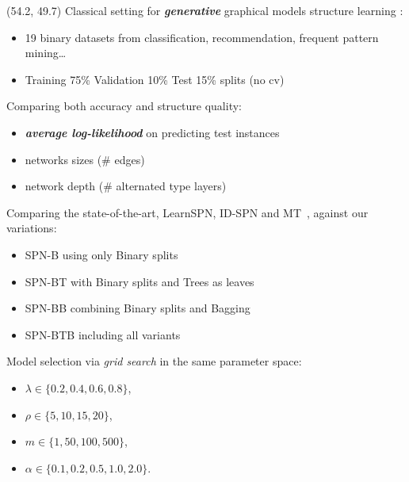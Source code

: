 \documentclass[final]{beamer}
\begin{document}
\begin{frame}{}
  \begin{textblock}{25.7}(54.2, 49.7)
    \footnotesize
    Classical setting for \emph{\textbf{generative}} graphical models
    structure learning \parencite{Gens2013}:
    \setlength{\leftmargini}{30pt}
    \begin{itemize}
      \itemsep 7pt
    \item 19 binary datasets from classification, recommendation,
      frequent pattern mining\dots \parencite{Lowd2010} \parencite{Haaren2012}
    \item Training 75\% Validation 10\% Test 15\%  splits (no cv)
    \end{itemize}\bigskip

    Comparing both accuracy and structure quality:
    \begin{itemize}
    \item \emph{\textbf{average log-likelihood}} on predicting test
      instances
    \item networks sizes (\# edges)
    \item network depth (\# alternated type layers)

    \end{itemize}\bigskip
    
    Comparing the state-of-the-art, \textsf{LearnSPN},
    \textsf{ID-SPN} and \textsf{MT}~\parencite{Meila2000}, against our
    variations:
    
    \begin{itemize}
    \item \textsf{SPN-B} using only \textsf{B}inary splits
    \item \textsf{SPN-BT} with \textsf{B}inary splits and \textsf{T}rees as leaves
    \item \textsf{SPN-BB} combining \textsf{B}inary splits and \textsf{B}agging
      \item \textsf{SPN-BTB} including all variants
    \end{itemize}\bigskip
    
    Model selection via \textit{grid search} in the same parameter
    space:
    \begin{minipage}[t]{0.35\linewidth}
      \begin{itemize}
      \item $\lambda \in \{0.2, 0.4, 0.6, 0.8\}$,
      \item $\rho \in \{5, 10, 15, 20\}$, 
      \end{itemize}
    \end{minipage}\begin{minipage}[t]{0.5\linewidth}
      \begin{itemize}
      \item $m \in \{1, 50, 100, 500\}$, 
      \item $\alpha \in \{ 0.1, 0.2, 0.5, 1.0, 2.0\}$.
      \end{itemize}
    \end{minipage}


\end{textblock}
\end{frame}
\end{document}
